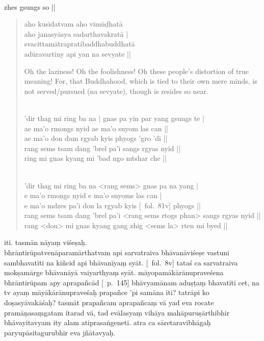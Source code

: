 \documentclass[12pt]{article}
\begin{document}
\textbf{\TVB}\\
zhes gsungs so ||\\

\begin{quote}
	aho kusīdatvam aho vimūḍhatā\\
	aho janasyāsya sadarthavakratā |\\
	svacittamātrapratibaddhabuddhatā\footnoteB{
		°pratibaddha°] \conj\ (\TIB; 'brel pa); °pratibuddha° \MS\ \EDD
	}\\
	adūravartiny api yan na sevyate ||

	Oh the laziness! Oh the foolishness! Oh these people's distortion of true meaning! For, that Buddhahood, which is tied to their own mere minds, is not served/pursued (na sevyate), though is resides so near.

	\textbf{\TVA}\\
	'dir thag mi ring ba na | gnas pa yin par yang gsungs te |\\
	ae ma'o rmongs nyid ae ma'o snyom las can || \\
	ae ma'o don dam rgyab kyis phyogs 'gro 'di || \\
	rang sems tsam dang 'brel pa'i sangs rgyas nyid || \\
	ring mi gnas kyang mi 'bad ngo mtshar che || 

	\textbf{\TVB}\\
	'dir thag mi ring ba na <rang sems> gnas pa na yang |\\
	e ma'o rmongs nyid e ma'o snyoms las can |\\
	e ma'o mdzes pa'i don la rgyab kyis [\TVB\ fol.\ 81v] phyogs || \\
	rang sems tsam dang 'brel pa'i <rang sems rtogs phan> sangs rgyas nyid || \\
	rang <don> mi gnas kyang gang zhig <sems la> rten mi byed || 
\end{quote}

iti. tasmān nāyaṃ viśeṣaḥ.\\

bhrāntirūpatvenāparamārthatvam api sarvatraiva bhāvanāviśeṣe vastuni sambhavatīti na kiñcid api bhāvanīyaṃ syāt. [\MS\ fol.\ 8v] tataś ca sarvatraiva mokṣamārge bhāvanāyā vaiyarthyaṃ syāt. māyopamākārānupraveśena bhrāntirūpam apy aprapañcād [\EDD\ p.\ 145] bhāvyamānam\footnoteB{
	aprapañcād bhāvyamānam] \EDD ; aprapañcā bhāvyamāṇam
} aduṣṭaṃ bhavatīti cet, na tv ayaṃ māyākārānupraveśaḥ prapañce 'pi samāna iti? tatrāpi ko doṣasyāvakāśaḥ? tasmāt prapañcam aprapañcaṃ vā yad eva rocate pramāṇasaṃgatam itarad vā, tad evālasyaṃ vihāya mahāpuruṣārthibhir bhāvayitavyam\footnoteB{
	bhāvayitavyam] \EDD ; bhaviyitavyam \MS
} ity alam atiprasaṅgeneti. atra ca sāretaravibhāgaḥ paryupāsitagurubhir eva jñātavyaḥ.\\
\end{document}
